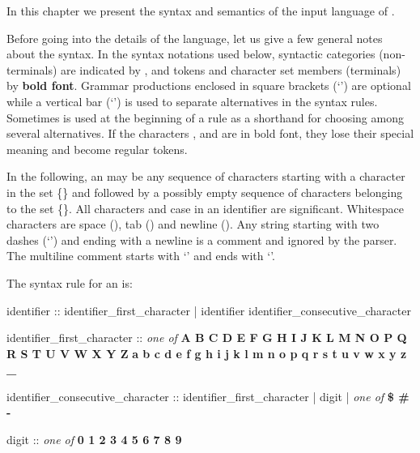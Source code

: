 
In this chapter we present the syntax and semantics of the input
language of \nusmv.

Before going into the details of the language, let us give a few general
notes about the syntax.
%
In the syntax notations used below, syntactic categories
(non-terminals) are indicated by , and tokens
and character set members (terminals) by \textbf{bold font}.
%
Grammar productions enclosed in square brackets (`\grammar{[]}') are
optional while a vertical bar (`\grammar{|}') is used to separate
alternatives in the syntax rules. Sometimes  is used
at the beginning of a rule as a shorthand for choosing among several
alternatives.
%
If the characters \grammar{\textbf{|}}, \grammar{\textbf{[}} and
\grammar{\textbf{]}} are in bold font, they lose their special
meaning and become regular tokens.

In the following, an  may be any sequence of
characters starting with a character in the set
\{{}\}
%
and followed by a possibly empty sequence of characters belonging to
the set
%
\{{}\}.
%
All characters and case in an identifier are significant. Whitespace
characters are space (\spc), tab (\tab) and newline (\ret).
%
Any string  starting with two
dashes (`\code{--}') and ending with a newline is a comment and
ignored by the parser. The multiline comment starts with `\code{/--}'
and ends with `\code{--/}'.

The syntax rule for an  is:

\begin{Grammar}
identifier :: 
        identifier_first_character
      | identifier identifier_consecutive_character

identifier_first_character :: \emph{one of}
        \textbf{A B C D E F G H I J K L M N O P Q R S T U V W X Y Z}
        \textbf{a b c d e f g h i j k l m n o p q r s t u v w x y z _}

identifier_consecutive_character :: 
        identifier_first_character
      | digit
      | \emph{one of} \textbf{\$ \# -}

digit :: \emph{one of} \textbf{0 1 2 3 4 5 6 7 8 9}
\end{Grammar}

